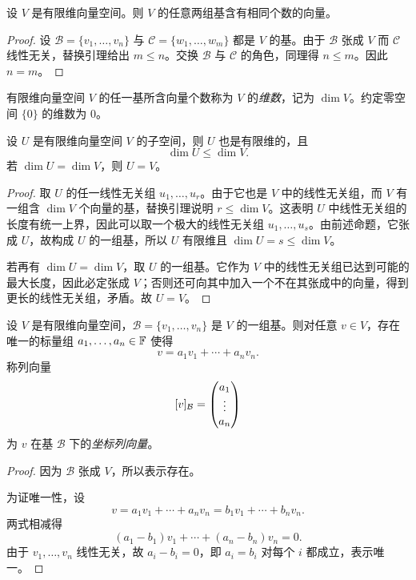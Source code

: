 \begin{theorem}[维数的良定义]
设 $V$ 是有限维向量空间。则 $V$ 的任意两组基含有相同个数的向量。
\end{theorem}

\begin{proof}
设 $\mathcal B=\{v_1,\dots,v_n\}$ 与 $\mathcal C=\{w_1,\dots,w_m\}$ 都是 $V$ 的基。由于 $\mathcal B$ 张成 $V$ 而 $\mathcal C$ 线性无关，替换引理给出 $m\le n$。交换 $\mathcal B$ 与 $\mathcal C$ 的角色，同理得 $n\le m$。因此 $n=m$。
\end{proof}

\begin{definition}
有限维向量空间 $V$ 的任一基所含向量个数称为 $V$ 的\emph{维数}，记为 $\dim V$。约定零空间 $\{0\}$ 的维数为 $0$。
\end{definition}

\begin{proposition}
设 $U$ 是有限维向量空间 $V$ 的子空间，则 $U$ 也是有限维的，且
\[
\dim U\le \dim V.
\]
若 $\dim U=\dim V$，则 $U=V$。
\end{proposition}

\begin{proof}
取 $U$ 的任一线性无关组 $u_1,\dots,u_r$。由于它也是 $V$ 中的线性无关组，而 $V$ 有一组含 $\dim V$ 个向量的基，替换引理说明 $r\le \dim V$。这表明 $U$ 中线性无关组的长度有统一上界，因此可以取一个极大的线性无关组 $u_1,\dots,u_s$。由前述命题，它张成 $U$，故构成 $U$ 的一组基，所以 $U$ 有限维且 $\dim U=s\le \dim V$。

若再有 $\dim U=\dim V$，取 $U$ 的一组基。它作为 $V$ 中的线性无关组已达到可能的最大长度，因此必定张成 $V$；否则还可向其中加入一个不在其张成中的向量，得到更长的线性无关组，矛盾。故 $U=V$。
\end{proof}

\begin{proposition}[坐标的存在唯一性]
设 $V$ 是有限维向量空间，$\mathcal B=\{v_1,\dots,v_n\}$ 是 $V$ 的一组基。则对任意 $v\in V$，存在唯一的标量组 $a_1,\dots,a_n\in\mathbb{F}$ 使得
\[
v=a_1v_1+\cdots+a_nv_n.
\]
称列向量
\[
[v]_{\mathcal B}=\begin{pmatrix} a_1\\ \vdots \\ a_n \end{pmatrix}
\]
为 $v$ 在基 $\mathcal B$ 下的\emph{坐标列向量}。
\end{proposition}

\begin{proof}
因为 $\mathcal B$ 张成 $V$，所以表示存在。

为证唯一性，设
\[
v=a_1v_1+\cdots+a_nv_n=b_1v_1+\cdots+b_nv_n.
\]
两式相减得
\[
(a_1-b_1)v_1+\cdots+(a_n-b_n)v_n=0.
\]
由于 $v_1,\dots,v_n$ 线性无关，故 $a_i-b_i=0$，即 $a_i=b_i$ 对每个 $i$ 都成立，表示唯一。
\end{proof}

